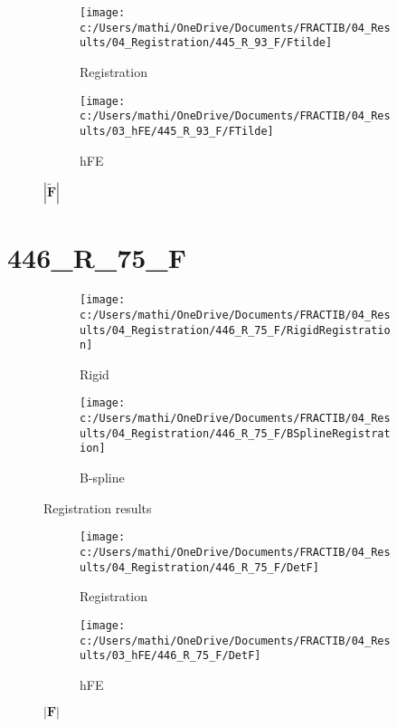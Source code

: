 \documentclass{article}%
\begin{document}
%


\begin{figure}[h!]%
\begin{subfigure}[b]{0.5\linewidth}%
\texttt{[image: c:/Users/mathi/OneDrive/Documents/FRACTIB/04\_Results/04\_Registration/445\_R\_93\_F/Ftilde]}%
\caption{Registration}%
\end{subfigure}%
\begin{subfigure}[b]{0.5\linewidth}%
\texttt{[image: c:/Users/mathi/OneDrive/Documents/FRACTIB/04\_Results/03\_hFE/445\_R\_93\_F/FTilde]}%
\caption{hFE}%
\end{subfigure}%
\caption{$|\widetilde{\mathbf{F}}|$}%
\end{figure}

%
\newpage%
\section*{446\_R\_75\_F}%
\label{sec:446R75F}%


\begin{figure}[h!]%
\begin{subfigure}[b]{0.5\linewidth}%
\texttt{[image: c:/Users/mathi/OneDrive/Documents/FRACTIB/04\_Results/04\_Registration/446\_R\_75\_F/RigidRegistration]}%
\caption{Rigid}%
\end{subfigure}%
\begin{subfigure}[b]{0.5\linewidth}%
\texttt{[image: c:/Users/mathi/OneDrive/Documents/FRACTIB/04\_Results/04\_Registration/446\_R\_75\_F/BSplineRegistration]}%
\caption{B{-}spline}%
\end{subfigure}%
\caption{Registration results}%
\end{figure}

%


\begin{figure}[h!]%
\begin{subfigure}[b]{0.5\linewidth}%
\texttt{[image: c:/Users/mathi/OneDrive/Documents/FRACTIB/04\_Results/04\_Registration/446\_R\_75\_F/DetF]}%
\caption{Registration}%
\end{subfigure}%
\begin{subfigure}[b]{0.5\linewidth}%
\texttt{[image: c:/Users/mathi/OneDrive/Documents/FRACTIB/04\_Results/03\_hFE/446\_R\_75\_F/DetF]}%
\caption{hFE}%
\end{subfigure}%
\caption{$|\mathbf{F}|$}%
\end{figure}

%
\end{document}
